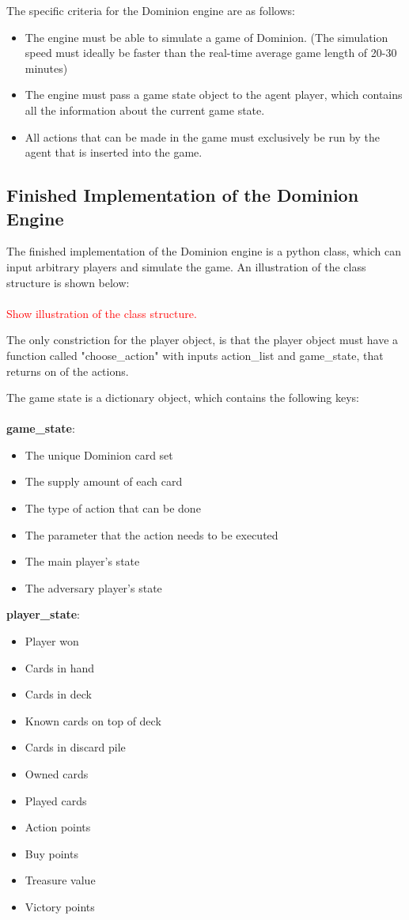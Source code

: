 The specific criteria for the Dominion engine are as follows:

\begin{itemize}
    \item The engine must be able to simulate a game of Dominion. (The simulation speed must ideally be faster than the real-time average game length of 20-30 minutes)
    \item The engine must pass a game state object to the agent player, which contains all the information about the current game state.
    \item All actions that can be made in the game must exclusively be run by the agent that is inserted into the game.
\end{itemize}

\subsection{Finished Implementation of the Dominion Engine}
The finished implementation of the Dominion engine is a python class, which can input arbitrary players and simulate the game. An illustration of the class structure is shown below:\\\\
\textcolor{red}{Show illustration of the class structure.}

The only constriction for the player object, is that the player object must have a function called "choose\_action" with inputs action\_list and game\_state, that returns on of the actions.

The game state is a dictionary object, which contains the following keys:\\\\
\textbf{game\_state}:
\begin{itemize}
    \item The unique Dominion card set
    \item The supply amount of each card
    \item The type of action that can be done
    \item The parameter that the action needs to be executed
    \item The main player's state
    \item The adversary player's state
\end{itemize}

\textbf{player\_state}:
\begin{itemize}
    \item Player won
    \item Cards in hand
    \item Cards in deck
    \item Known cards on top of deck
    \item Cards in discard pile
    \item Owned cards
    \item Played cards
    \item Action points
    \item Buy points
    \item Treasure value
    \item Victory points
\end{itemize}

